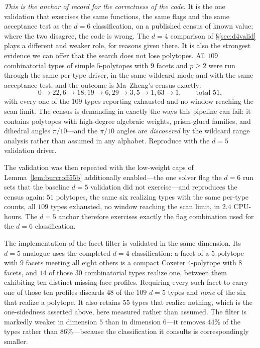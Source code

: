 \documentclass[11pt,reqno]{amsart}
\theoremstyle{plain}
\theoremstyle{definition}
\newcommand{\DFiveTotal}{51}
\newcommand{\DFiveTypes}{109}
\newcommand{\DFiveCPUHours}{2.4}
\newcommand{\DFiveRealizing}{0\!\to\!22, 6\!\to\!18, 19\!\to\!6, 29\!\to\!3, 5\!\to\!1, 63\!\to\!1}
\begin{document}
\emph{This is the anchor of record for the correctness of the code.} It is the
one validation that exercises the same functions, the same flags and the same
acceptance test as the $d=6$ classification, on a published census of known
value; where the two disagree, the code is wrong. The $d=4$ comparison of
\S\ref{sec:d4valid} plays a different and weaker role, for reasons given there.
It is also the strongest evidence we can offer that the search does not lose
polytopes. All $\DFiveTypes$ combinatorial types of simple $5$-polytopes with
$9$ facets and $p\ge2$ were run through the same per-type driver, in the same wildcard mode and with the
same acceptance test, and the outcome is Ma--Zheng's census exactly:
\[
\DFiveRealizing,\qquad\text{total } \DFiveTotal ,
\]
with every one of the $\DFiveTypes$ types reporting exhausted and no
window reaching the scan limit. The census is demanding in exactly the ways this
pipeline can fail: it contains polytopes with high-degree algebraic
weights, prism-glued families, and dihedral angles $\pi/10$---and the $\pi/10$
angles are \emph{discovered} by the wildcard range analysis rather than assumed
in any alphabet. Reproduce with the $d=5$ validation driver.

The validation was then repeated with the low-weight caps of
Lemma~\ref{lem:burcroff55b} additionally enabled---the one solver flag the $d=6$
run sets that the baseline $d=5$ validation did not exercise---and reproduces
the census again: $\DFiveTotal$ polytopes, the same six realizing types with the
same per-type counts, all $\DFiveTypes$ types exhausted, no
window reaching the scan limit, in $\DFiveCPUHours$ CPU-hours. The $d=5$ anchor therefore
exercises exactly the flag combination used for the $d=6$ classification.


The implementation of the facet filter is validated in the same dimension. Its
$d=5$ analogue uses the completed $d=4$ classification: a facet of a $5$-polytope
with $9$ facets meeting all eight others is a compact Coxeter $4$-polytope with $8$
facets, and $14$ of those $30$ combinatorial types realize one, between them
exhibiting ten distinct missing-face profiles. Requiring every such facet to carry
one of those ten profiles discards $48$ of the $109$ $d=5$ types and \emph{none} of
the six that realize a polytope. It also retains $55$ types that realize nothing,
which is the one-sidedness asserted above, here measured rather than assumed. The
filter is markedly weaker in dimension $5$ than in dimension $6$---it removes $44\%$
of the types rather than $86\%$---because the classification it consults is
correspondingly smaller.
\end{document}
